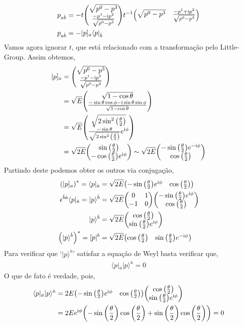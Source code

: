 \begin{align*}
    p_{a\dot b}&=-t\mqty(\sqrt{p^0-p^3}\\\frac{-p^1-\im p^2}{\sqrt{p^0-p^3}})t^{-1}\mqty(\sqrt{p^0-p^3}&\frac{-p^1+\im p^2}{\sqrt{p^0-p^3}})\\
    p_{a\dot b}&=-|p]_a\langle p|_{\dot b}
\end{align*}
Vamos agora ignorar $t$, que está relacionado com a transformação pelo Little-Group. Assim obtemos,
\begin{align*}
    |p]_a&=\mqty(\sqrt{p^0-p^3}\\\frac{-p^1-\im p^2}{\sqrt{p^0-p^3}})\\
    &=\sqrt{E}\mqty(\sqrt{1-\cos\theta}\\\frac{-\sin\theta\cos\phi-\im \sin\theta\sin\phi}{\sqrt{1-\cos\theta}})\\
    &=\sqrt{E}\mqty(\sqrt{2\sin^2\qty(\frac\theta2)}\\\frac{-\sin\theta}{\sqrt{2\sin^2\qty(\frac\theta2)}}e^{\im\phi})\\
    &=\sqrt{2E}\mqty(\sin\qty(\frac\theta2)\\-\cos\qty(\frac\theta2)e^{\im\phi})\sim\sqrt{2E}\mqty(-\sin\qty(\frac\theta2)e^{-\im\phi}\\\cos\qty(\frac\theta2))\\
\end{align*}
Partindo deste podemos obter os outros via conjugação,
\begin{align*}
    \qty(|p]_a)^\ast=\langle p|_{\dot a}&=\sqrt{2E}\mqty(-\sin\qty(\frac\theta2)e^{\im\phi}&\cos\qty(\frac\theta2))\\
    \epsilon^{\dot b\dot a}\langle p|_{\dot a}=|p\rangle^{\dot b}&=\sqrt{2E}\mqty(0&1\\-1&0)\mqty(-\sin\qty(\frac\theta2)e^{\im\phi}\\\cos\qty(\frac\theta2))\\
    |p\rangle^{\dot b}&=\sqrt{2E}\mqty(\cos\qty(\frac\theta2)\\\sin\qty(\frac\theta2)e^{\im\phi})\\
    \qty(|p\rangle^{\dot b})^\ast=[p|^b&=\sqrt{2E}\mqty(\cos\qty(\frac\theta2)&\sin\qty(\frac\theta2)e^{-\im\phi})
\end{align*}
Para verificar que `$|p\rangle^{\dot a}$' satisfaz a equação de Weyl basta verificar que,
\begin{align*}
    \langle p|_{\dot a}| p\rangle^{\dot a}=0
\end{align*}
O que de fato é verdade, pois,
\begin{align*}
    \langle p|_{\dot a}| p\rangle^{\dot a}&=2E\mqty(-\sin\qty(\frac\theta2)e^{\im\phi}&\cos\qty(\frac\theta2))\mqty(\cos\qty(\frac\theta2)\\\sin\qty(\frac\theta2)e^{\im\phi})\\
    &=2Ee^{\im\phi}\qty(-\sin\qty(\frac\theta2)\cos\qty(\frac\theta2)+\sin\qty(\frac\theta2)\cos\qty(\frac\theta2))=0
\end{align*}
